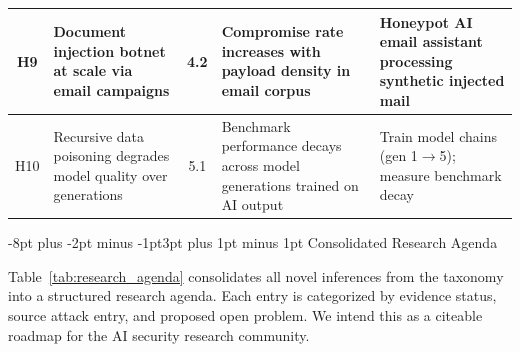 \documentclass[conference]{IEEEtran}
\makeatletter
\renewcommand{\subsection}{\@startsection{subsection}{2}{\z@}%
  {-8pt plus -2pt minus -1pt}{3pt plus 1pt minus 1pt}%
  {\normalfont\normalsize\bfseries\sffamily\color{accentblue}}}
\makeatother
\begin{document}
\begin{table}[!htbp]
\begin{tabular}{cp{3.5cm}cp{4.0cm}p{4.0cm}}
\midrule
H9 & Document injection botnet at scale via email campaigns & 4.2 & Compromise rate increases with payload density in email corpus & Honeypot AI email assistant processing synthetic injected mail \\
\midrule
H10 & Recursive data poisoning degrades model quality over generations & 5.1 & Benchmark performance decays across model generations trained on AI output & Train model chains (gen 1$\rightarrow$5); measure benchmark decay \\
\bottomrule
\end{tabular}
\end{table}

\subsection{Consolidated Research Agenda}

Table~\ref{tab:research_agenda} consolidates all novel inferences from the taxonomy into a structured research agenda. Each entry is categorized by evidence status, source attack entry, and proposed open problem. We intend this as a citeable roadmap for the AI security research community.
\end{document}
